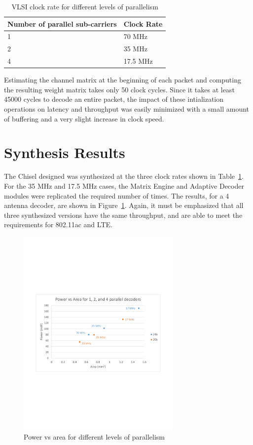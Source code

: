 \documentclass[journal]{IEEEtran}
\begin{document}
\begin{table}[!h]
\caption{VLSI clock rate for different levels of parallelism}
\label{clock_rate_table}
\centering
\begin{tabular}{l l}
\hline
Number of parallel sub-carriers & Clock Rate \\
\hline
1 & 70 MHz \\
2 & 35 MHz \\
4 & 17.5 MHz \\
\hline
\end{tabular}
\end{table}

Estimating the channel matrix at the beginning of each packet and computing the resulting weight matrix takes only 50 clock cycles. Since it takes at least 45000 cycles to decode an entire packet, the impact of these intialization operations on latency and throughput was easily minimized with a small amount of buffering and a very slight increase in clock speed.


\section{Synthesis Results}

The Chisel designed was synthesized at the three clock rates shown in Table~\ref{clock_rate_table}. For the 35 MHz and 17.5 MHz cases, the Matrix Engine and Adaptive Decoder modules were replicated the required number of times. The results, for a 4 antenna decoder, are shown in Figure~\ref{power_vs_area}. Again, it must be emphasized that all three synthesized versions have the same throughput, and are able to meet the requirements for 802.11ac and LTE.

\begin{figure}[!h]
\centering
\includegraphics*[width=8cm, viewport = 60 250 560 540]{images/power_vs_area.pdf}
\caption{Power vs area for different levels of parallelism}
\label{power_vs_area}
\end{figure}
\end{document}

